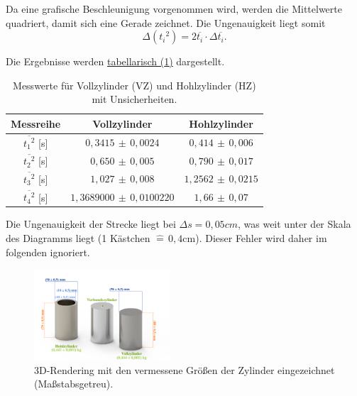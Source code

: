 Da eine grafische Beschleunigung vorgenommen wird, werden die Mittelwerte quadriert, damit sich eine Gerade zeichnet. Die Ungenauigkeit liegt somit
\begin{equation}
    \Delta ({t_i}^2) = 2 \overline{t_i} \cdot \Delta \overline{t_i}.
\end{equation}

Die Ergebnisse werden \hyperref[tab:mittelwerte]{tabellarisch (\ref*{tab:mittelwerte})} dargestellt.

\begin{table}[!ht]
    \centering
    \hspace*{-2cm}
    \begin{tabular}{c | c | c}
    \toprule
    Messreihe & Vollzylinder & Hohlzylinder \\
    \hline
    $\overline{{t_1}^2}$ [s]& $0,3415 \,\pm\, 0,0024$         & $0,414 \,\pm\, 0,006$ \\
    $\overline{{t_2}^2}$ [s]& $0,650 \,\pm\, 0,005$           & $0,790 \,\pm\, 0,017$ \\
    $\overline{{t_3}^2}$ [s]& $1,027 \,\pm\, 0,008$           & $1,2562 \,\pm\, 0,0215$ \\
    $\overline{{t_4}^2}$ [s]& $1,3689000 \,\pm\, 0,0100220$   & $1,66 \,\pm\, 0,07$ \\
    \bottomrule
    \end{tabular}
    \caption{Messwerte für Vollzylinder (VZ) und Hohlzylinder (HZ) mit Unsicherheiten.}
    \label{tab:mittelwerte}
\end{table}


Die Ungenauigkeit der Strecke liegt bei $\Delta s = 0,05 cm$, was weit unter der Skala des Diagramms liegt (1 Kästchen $\hat = \, 0,4$cm). Dieser Fehler wird daher im folgenden ignoriert.

\begin{figure}[!ht]
    \centering
    \includegraphics[width=0.45\textwidth]{img/15/Zylindermasse.pdf}
    \caption{3D-Rendering mit den vermessene Größen der Zylinder eingezeichnet (Maßstabsgetreu).}
    \label{fig:zylinder_masse_klein}
\end{figure}


